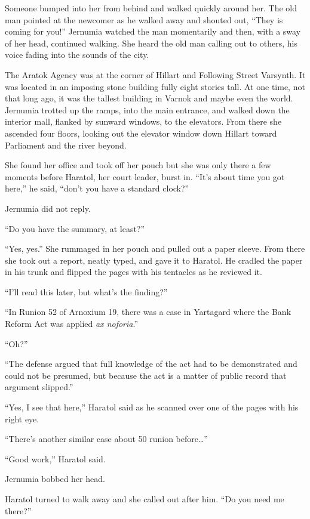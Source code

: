 Someone bumped into her from behind and walked quickly around her. The old man pointed at the
newcomer as he walked away and shouted out, ``They is coming for you!'' Jernumia watched the man
momentarily and then, with a sway of her head, continued walking. She heard the old man calling
out to others, his voice fading into the sounds of the city.

The Aratok Agency was at the corner of Hillart and Following Street Varsynth. It was located in
an imposing stone building fully eight stories tall. At one time, not that long ago, it was the
tallest building in Varnok and maybe even the world. Jernumia trotted up the ramps, into the
main entrance, and walked down the interior mall, flanked by sunward windows, to the elevators.
From there she ascended four floors, looking out the elevator window down Hillart toward
Parliament and the river beyond.

She found her office and took off her pouch but she was only there a few moments before Haratol,
her court leader, burst in. ``It's about time you got here,'' he said, ``don't you have a
standard clock?''

Jernumia did not reply.

``Do you have the summary, at least?''

``Yes, yes.'' She rummaged in her pouch and pulled out a paper sleeve. From there she took out a
report, neatly typed, and gave it to Haratol. He cradled the paper in his trunk and flipped the
pages with his tentacles as he reviewed it.

``I'll read this later, but what's the finding?''

``In Runion 52 of Arnoxium 19, there was a case in Yartagard where the Bank Reform Act was
applied \textit{ax noforia}.''

``Oh?''

``The defense argued that full knowledge of the act had to be demonstrated and could not be
presumed, but because the act is a matter of public record that argument slipped.''

``Yes, I see that here,'' Haratol said as he scanned over one of the pages with his right eye.

``There's another similar case about 50 runion before\ldots''

``Good work,'' Haratol said.

Jernumia bobbed her head.

Haratol turned to walk away and she called out after him. ``Do you need me there?''

